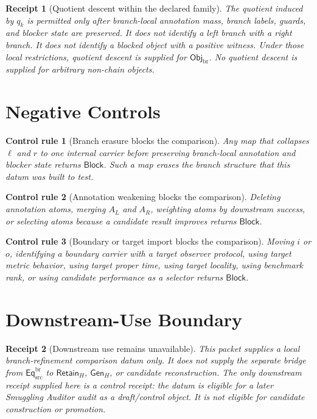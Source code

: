 \documentclass[11pt]{article}
\newcommand{\EqBr}{\mathsf{Eq}_{\mathrm{src}}^{\mathrm{br}}}
\newcommand{\ObjBr}{\mathsf{Obj}_{\mathrm{br}}}
\newcommand{\RetainH}{\mathsf{Retain}_{H}}
\newcommand{\GenH}{\mathsf{Gen}_{H}}
\newcommand{\Block}{\mathsf{Block}}
\newtheorem{receipt}{Receipt}
\newtheorem{controlrule}{Control rule}
\begin{document}
\begin{receipt}[Quotient descent within the declared family]
The quotient induced by \(q_{k}\) is permitted only after branch-local
annotation mass, branch labels, guards, and blocker state are preserved.
It does not identify a left branch with a right branch. It does not
identify a blocked object with a positive witness. Under those local
restrictions, quotient descent is supplied for \(\ObjBr\). No quotient
descent is supplied for arbitrary non-chain objects.
\end{receipt}

\section{Negative Controls}

\begin{controlrule}[Branch erasure blocks the comparison]
Any map that collapses \(\ell\) and \(r\) to one internal carrier before
preserving branch-local annotation and blocker state returns \(\Block\).
Such a map erases the branch structure that this datum was built to test.
\end{controlrule}

\begin{controlrule}[Annotation weakening blocks the comparison]
Deleting annotation atoms, merging \(A_{L}\) and \(A_{R}\), weighting
atoms by downstream success, or selecting atoms because a candidate result
improves returns \(\Block\).
\end{controlrule}

\begin{controlrule}[Boundary or target import blocks the comparison]
Moving \(i\) or \(o\), identifying a boundary carrier with a target
observer protocol, using target metric behavior, using target proper time,
using target locality, using benchmark rank, or using candidate
performance as a selector returns \(\Block\).
\end{controlrule}

\section{Downstream-Use Boundary}

\begin{receipt}[Downstream use remains unavailable]
This packet supplies a local branch-refinement comparison datum only. It
does not supply the separate bridge from \(\EqBr\) to \(\RetainH\),
\(\GenH\), or candidate reconstruction. The only downstream receipt
supplied here is a control receipt: the datum is eligible for a later
Smuggling Auditor audit as a draft/control object. It is not eligible for
candidate construction or promotion.
\end{receipt}
\end{document}
